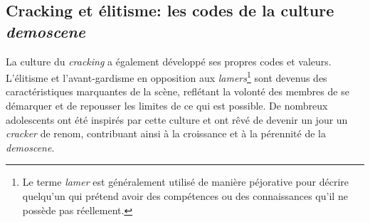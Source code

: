 
\subsection*{Cracking et élitisme: les codes de la culture \textit{demoscene}}
La culture du \textit{cracking} a également développé ses propres codes et valeurs. L'élitisme et l'avant-gardisme en opposition aux \textit{lamers}\footnote{Le terme \textit{lamer} est généralement utilisé de manière péjorative pour décrire quelqu'un qui prétend avoir des compétences ou des connaissances qu'il ne possède pas réellement.} sont devenus des caractéristiques marquantes de la scène, reflétant la volonté des membres de se démarquer et de repousser les limites de ce qui est possible. De nombreux adolescents ont été inspirés par cette culture et ont rêvé de devenir un jour un \textit{cracker} de renom, contribuant ainsi à la croissance et à la pérennité de la \textit{demoscene}.


